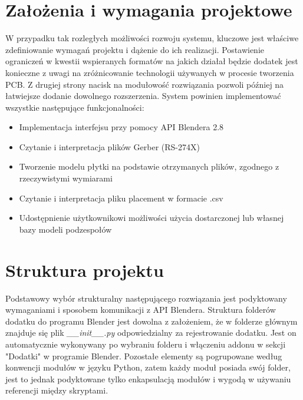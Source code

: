 \documentclass{xmgr}
\begin{document}
\section{Założenia i wymagania projektowe}
W przypadku tak rozległych możliwości rozwoju systemu, kluczowe jest właściwe zdefiniowanie wymagań projektu i dążenie do ich realizacji. Postawienie ograniczeń w kwestii wspieranych formatów na jakich działał będzie dodatek jest konieczne z uwagi na zróżnicowanie technologii używanych w procesie tworzenia PCB. Z drugiej strony nacisk na modułowość rozwiązania pozwoli później na łatwiejsze dodanie dowolnego rozszerzenia.
System powinien implementować wszystkie następujące funkcjonalności:

\begin{itemize}

\item Implementacja interfejsu przy pomocy API Blendera 2.8

\item Czytanie i interpretacja plików Gerber (RS-274X)

\item Tworzenie modelu płytki na podstawie otrzymanych plików, zgodnego z rzeczywistymi wymiarami

\item Czytanie i interpretacja pliku placement w formacie .csv

\item Udostępnienie użytkownikowi możliwości użycia dostarczonej lub własnej bazy modeli podzespołów

\end{itemize}

\section {Struktura projektu}
Podstawowy wybór strukturalny następującego rozwiązania jest podyktowany wymaganiami i sposobem komunikacji z API Blendera. Struktura folderów dodatku do programu Blender jest dowolna z założeniem, że w folderze głównym znajduje się plik \emph{\_\_init\_\_.py} odpowiedzialny za rejestrowanie dodatku. Jest on automatycznie wykonywany po wybraniu folderu i włączeniu addonu w sekcji "Dodatki" w programie Blender. Pozostałe elementy są pogrupowane według konwencji modułów w języku Python, zatem każdy moduł posiada swój folder, jest to jednak podyktowane tylko enkapsulacją modułów i wygodą w używaniu referencji między skryptami.
\end{document}
